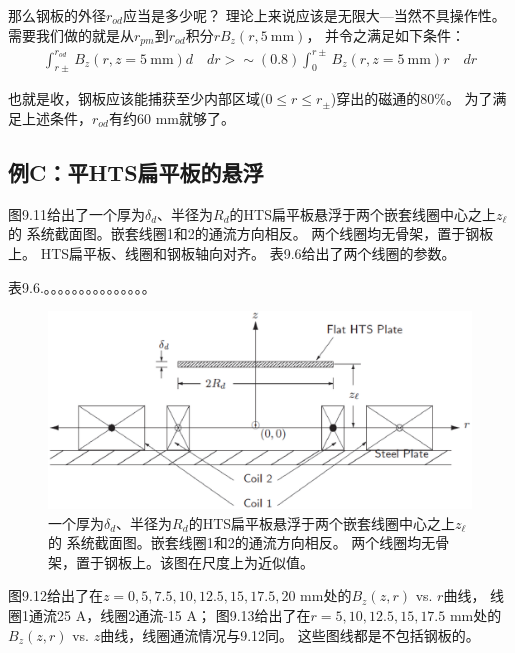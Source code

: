那么钢板的外径$r_{od}$应当是多少呢？
理论上来说应该是无限大---当然不具操作性。
需要我们做的就是从$r_{pm}$到$r_{od}$积分$rB_z(r,5\ \mathrm{mm})$，
并令之满足如下条件：
\begin{align*}%
\int_{r\pm}^{r_{od}}B_{z}(r,z=5\ \mathrm{ mm})d\quad dr>\sim(0.8)\int_{0}^{r\pm}B_{z}(r,z=5\ \mathrm{ mm})r\quad dr
\end{align*}

也就是收，钢板应该能捕获至少内部区域($0\le r\le r_{\pm}$)穿出的磁通的80\%。
为了满足上述条件，$r_{od}$有约60 mm就够了。


\subsection{例C：平HTS扁平板的悬浮}
图9.11给出了一个厚为$\delta_d$、半径为$R_d$的HTS扁平板悬浮于两个嵌套线圈中心之上$z_\ell$的
系统截面图。嵌套线圈1和2的通流方向相反。
两个线圈均无骨架，置于钢板上。
HTS扁平板、线圈和钢板轴向对齐。
表9.6给出了两个线圈的参数。

表9.6.。。。。。。。。。。。。。。。

\begin{figure}
	\centering
	\includegraphics[scale=0.5]{chpt9/figs/fig9.11.eps}
	\caption{一个厚为$\delta_d$、半径为$R_d$的HTS扁平板悬浮于两个嵌套线圈中心之上$z_\ell$的
		系统截面图。嵌套线圈1和2的通流方向相反。
		两个线圈均无骨架，置于钢板上。该图在尺度上为近似值。}
\end{figure}

图9.12给出了在$z=0,5,7.5,10,12.5,15,17.5,20$ mm处的$B_z(z,r)$ vs. $r$曲线，
线圈1通流25 A，线圈2通流-15 A；
图9.13给出了在$r=5,10,12.5,15,17.5$ mm处的$B_z(z,r)$ vs. $z$曲线，线圈通流情况与9.12同。
这些图线都是不包括钢板的。

